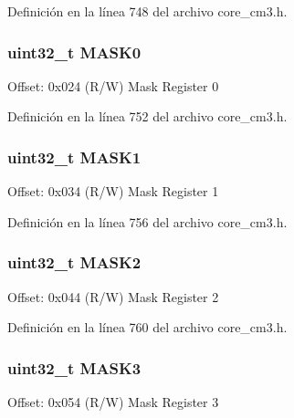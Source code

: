 Definición en la línea 748 del archivo core\+\_\+cm3.\+h.

\subsubsection[{\texorpdfstring{M\+A\+S\+K0}{MASK0}}]{ uint32\+\_\+t M\+A\+S\+K0}\hypertarget{struct_d_w_t___type_ab3f06e2cb3a76edc6f3fc90af88671ba}{}\label{struct_d_w_t___type_ab3f06e2cb3a76edc6f3fc90af88671ba}
Offset\+: 0x024 (R/W) Mask Register 0 

Definición en la línea 752 del archivo core\+\_\+cm3.\+h.

\subsubsection[{\texorpdfstring{M\+A\+S\+K1}{MASK1}}]{ uint32\+\_\+t M\+A\+S\+K1}\hypertarget{struct_d_w_t___type_ad55962dd61d94bd029f6927adc48bc31}{}\label{struct_d_w_t___type_ad55962dd61d94bd029f6927adc48bc31}
Offset\+: 0x034 (R/W) Mask Register 1 

Definición en la línea 756 del archivo core\+\_\+cm3.\+h.

\subsubsection[{\texorpdfstring{M\+A\+S\+K2}{MASK2}}]{ uint32\+\_\+t M\+A\+S\+K2}\hypertarget{struct_d_w_t___type_a860e7bcdcf674491835d91189bda3c61}{}\label{struct_d_w_t___type_a860e7bcdcf674491835d91189bda3c61}
Offset\+: 0x044 (R/W) Mask Register 2 

Definición en la línea 760 del archivo core\+\_\+cm3.\+h.

\subsubsection[{\texorpdfstring{M\+A\+S\+K3}{MASK3}}]{ uint32\+\_\+t M\+A\+S\+K3}\hypertarget{struct_d_w_t___type_a541b20e412d5586312fa4dac4a151660}{}\label{struct_d_w_t___type_a541b20e412d5586312fa4dac4a151660}
Offset\+: 0x054 (R/W) Mask Register 3 

